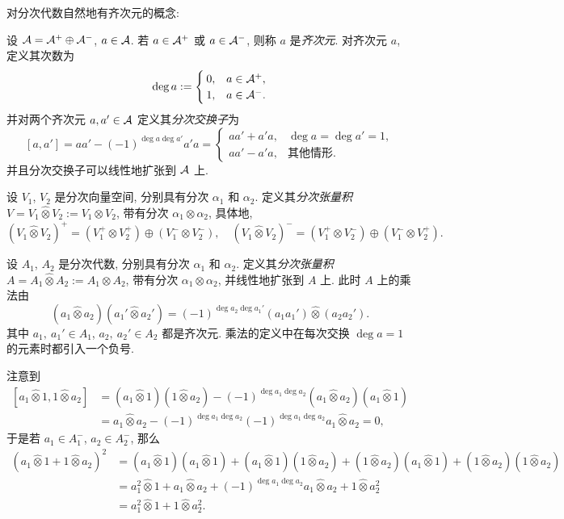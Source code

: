 对分次代数自然地有齐次元的概念:

\begin{Definition}
	设 $ \mathcal{A}=\mathcal{A}^{+}\oplus\mathcal{A}^{-} $, $ a\in\mathcal{A} $. 若 $ a\in\mathcal{A}^+ $ 或 $ a\in\mathcal{A}^- $, 则称 $ a $ 是\emph{齐次元}. 对齐次元 $ a $, 定义其次数为
	\[
		\deg a:=\begin{cases}
			0, & a\in\mathcal{A}^+,\\ 1, & a\in\mathcal{A}^-.
		\end{cases}
	\]
	并对两个齐次元 $ a,a'\in\mathcal{A} $ 定义其\emph{分次交换子}为
	\[
		[a,a']=aa'-(-1)^{\deg a\deg a'}a'a=\begin{cases}
			aa'+a'a, & \deg a=\deg a'=1,\\ aa'-a'a, & \text{其他情形}.
		\end{cases}
	\]
	并且分次交换子可以线性地扩张到 $ \mathcal{A} $ 上.
\end{Definition}

\begin{Definition}[分次张量积]
	设 $ V_1 $, $ V_2 $ 是分次向量空间, 分别具有分次 $ \alpha_1 $ 和 $ \alpha_2 $. 定义其\emph{分次张量积} $ V=V_1\widehat{\otimes}V_2:=V_1\otimes V_2 $, 带有分次 $ \alpha_1\otimes\alpha_2 $, 具体地, 
	\[
		(V_1\widehat{\otimes}V_2)^+=(V_1^+\otimes V_2^+)\oplus(V_1^-\otimes V_2^-),\quad (V_1\widehat{\otimes}V_2)^-=(V_1^+\otimes V_2^-)\oplus(V_1^-\otimes V_2^+).
	\]

	设 $ A_1 $, $ A_2 $ 是分次代数, 分别具有分次 $ \alpha_1 $ 和 $ \alpha_2 $. 定义其\emph{分次张量积} $ A=A_1\widehat{\otimes}A_2:=A_1\otimes A_2 $, 带有分次 $ \alpha_1\otimes\alpha_2 $, 并线性地扩张到 $ A $ 上. 此时 $ A $ 上的乘法由
	\[
		(a_1\widehat{\otimes}a_2)(a_1'\widehat{\otimes}a_2')=(-1)^{\deg a_2\deg a_1'}(a_1a_1')\widehat{\otimes}(a_2a_2').
	\]
	其中 $ a_1,\ a_1'\in A_1 $, $ a_2,\ a_2'\in A_2 $ 都是齐次元. 乘法的定义中在每次交换 $ \deg a=1 $ 的元素时都引入一个负号.
\end{Definition}

注意到
\[
	\begin{aligned}
		[a_1\widehat{\otimes}1, 1\widehat{\otimes}a_2]&=(a_1\widehat{\otimes}1)(1\widehat{\otimes}a_2)-(-1)^{\deg a_1\deg a_2}(a_1\widehat{\otimes}a_2)(a_1\widehat{\otimes}1)\\
		&=a_1\widehat{\otimes}a_2-(-1)^{\deg a_1\deg a_2}(-1)^{\deg a_1\deg a_2}a_1\widehat{\otimes}a_2=0,
	\end{aligned}
\]
于是若 $ a_1\in A_1^- $, $ a_2\in A_2^- $, 那么
\[
	\begin{aligned}
		(a_1\widehat{\otimes}1+1\widehat{\otimes}a_2)^2&=(a_1\widehat{\otimes}1)(a_1\widehat{\otimes}1)+(a_1\widehat{\otimes}1)(1\widehat{\otimes}a_2)+(1\widehat{\otimes}a_2)(a_1\widehat{\otimes}1)+(1\widehat{\otimes}a_2)(1\widehat{\otimes}a_2)\\
		&=a_1^2\widehat{\otimes}1+a_1\widehat{\otimes}a_2+(-1)^{\deg a_1\deg a_2}a_1\widehat{\otimes}a_2+1\widehat{\otimes}a_2^2\\
		&=a_1^2\widehat{\otimes}1+1\widehat{\otimes}a_2^2.
	\end{aligned}
\]

